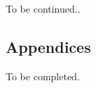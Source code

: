 \documentclass{l4proj}
\begin{document}
To be continued..

%
% 

\begin{appendices}

\chapter{Appendices}

To be completed.

\end{appendices}






\end{document}
